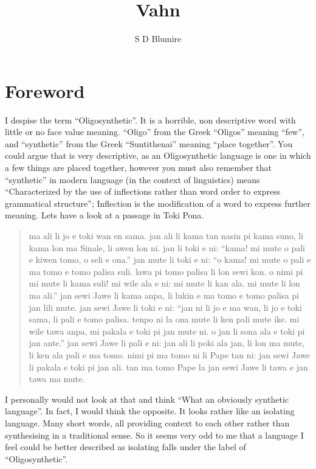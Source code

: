\documentclass{article}
\title{Vahn}
\author{S D Blumire}
\begin{document}
\maketitle
\thispagestyle{empty}
\newpage

\tableofcontents
\listoftables
\newpage

\section{Foreword}

I despise the term ``Oligosynthetic''. It is a horrible, non descriptive word with little or no face
value meaning. ``Oligo'' from the Greek ``Oligos'' meaning ``few'', and ``synthetic'' from the Greek
``Suntithenai'' meaning ``place together''. You could argue that is very descriptive, as an
Oligosynthetic language is one in which a few things are placed together, however you must also
remember that ``synthetic'' in modern language (in the context of linguistics) means ``Characterized
by the use of inflections rather than word order to express grammatical structure''; Inflection is
the modification of a word to express further meaning. Lets have a look at a passage in Toki Pona.
\blockquote{
    ma ali li jo e toki wan en sama. jan ali li kama tan nasin pi kama suno, li kama lon ma Sinale,
    li awen lon ni. jan li toki e ni: ``kama! mi mute o pali e kiwen tomo, o seli e ona.'' jan mute
    li toki e ni: ``o kama! mi mute o pali e ma tomo e tomo palisa suli. lawa pi tomo palisa li lon
    sewi kon. o nimi pi mi mute li kama suli! mi wile ala e ni: mi mute li kan ala. mi mute li lon
    ma ali.'' jan sewi Jawe li kama anpa, li lukin e ma tomo e tomo palisa pi jan lili mute. jan
    sewi Jawe li toki e ni: ``jan ni li jo e ma wan, li jo e toki sama, li pali e tomo palisa. tenpo
    ni la ona mute li ken pali mute ike. mi wile tawa anpa, mi pakala e toki pi jan mute ni. o jan
    li sona ala e toki pi jan ante.'' jan sewi Jawe li pali e ni: jan ali li poki ala jan, li lon ma
    mute, li ken ala pali e ma tomo. nimi pi ma tomo ni li Pape tan ni: jan sewi Jawe li pakala e
    toki pi jan ali. tan ma tomo Pape la jan sewi Jawe li tawa e jan tawa ma mute.
}

I personally would not look at that and think ``What an obviously synthetic language''. In fact, I
would think the opposite. It looks rather like an isolating language. Many short words, all
providing context to each other rather than synthesising in a traditional sense. So it seems very
odd to me that a language I feel could be better described as isolating falls under the label of
``Oligosynthetic''.
\end{document}
